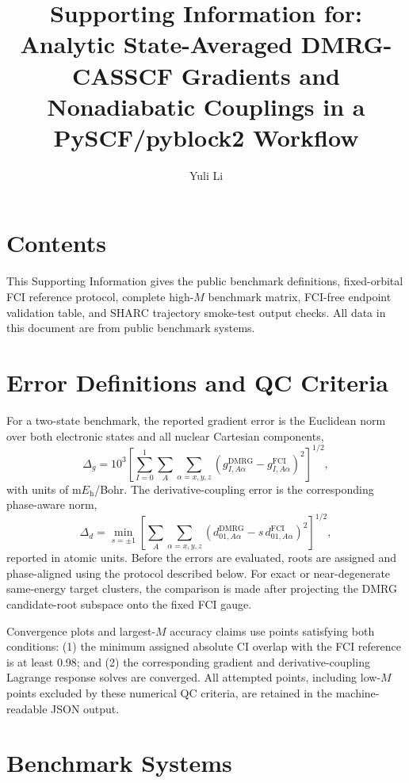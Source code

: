 \documentclass[manuscript=suppinfo]{achemso}
\title{Supporting Information for: Analytic State-Averaged DMRG-CASSCF Gradients and Nonadiabatic Couplings in a PySCF/pyblock2 Workflow}
\author{Yuli Li}
\affiliation[Harvard University]
{Department of Chemistry and Chemical Biology, Harvard University, Cambridge,
Massachusetts 02138, United States}
\newcommand{\Eh}{E_{\mathrm{h}}}
\begin{document}
\maketitle

\section{Contents}

This Supporting Information gives the public benchmark definitions, fixed-orbital
FCI reference protocol, complete high-$M$ benchmark matrix, FCI-free endpoint
validation table, and SHARC trajectory smoke-test output checks.  All data in
this document are from public benchmark systems.

\section{Error Definitions and QC Criteria}

For a two-state benchmark, the reported gradient error is the Euclidean norm
over both electronic states and all nuclear Cartesian components,
\begin{equation}
\Delta_g =
10^3
\left[
\sum_{I=0}^{1}\sum_A\sum_{\alpha=x,y,z}
\left(
g^{\mathrm{DMRG}}_{I,A\alpha}
-g^{\mathrm{FCI}}_{I,A\alpha}
\right)^2
\right]^{1/2},
\end{equation}
with units of m$\Eh$/Bohr.  The derivative-coupling error is the corresponding
phase-aware norm,
\begin{equation}
\Delta_d =
\min_{s=\pm 1}
\left[
\sum_A\sum_{\alpha=x,y,z}
\left(
d^{\mathrm{DMRG}}_{01,A\alpha}
-s\,d^{\mathrm{FCI}}_{01,A\alpha}
\right)^2
\right]^{1/2},
\end{equation}
reported in atomic units.  Before the errors are evaluated, roots are assigned
and phase-aligned using the protocol described below.  For exact or
near-degenerate same-energy target clusters, the comparison is made after
projecting the DMRG candidate-root subspace onto the fixed FCI gauge.

Convergence plots and largest-$M$ accuracy claims use points satisfying both
conditions: (1) the minimum assigned absolute CI overlap with the FCI reference
is at least 0.98; and (2) the corresponding gradient and derivative-coupling
Lagrange response solves are converged.  All attempted points, including
low-$M$ points excluded by these numerical QC criteria, are retained in the
machine-readable JSON output.

\section{Benchmark Systems}
\end{document}

